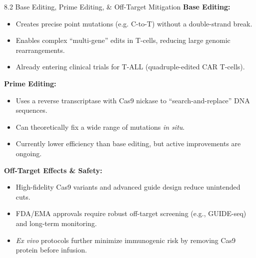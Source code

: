 \documentclass[10pt]{beamer}
\begin{document}
\begin{frame}{8.2 Base Editing, Prime Editing, \& Off-Target Mitigation}
  \textbf{Base Editing:}
  \begin{itemize}
    \item Creates precise point mutations (e.g. C-to-T) without a double-strand break.
    \item Enables complex “multi-gene” edits in T-cells, reducing large genomic rearrangements.
    \item Already entering clinical trials for T-ALL (quadruple-edited CAR T-cells).
  \end{itemize}

  \vspace{0.3em}
  \textbf{Prime Editing:}
  \begin{itemize}
    \item Uses a reverse transcriptase with Cas9 nickase to “search-and-replace” DNA sequences.
    \item Can theoretically fix a wide range of mutations \textit{in situ}.
    \item Currently lower efficiency than base editing, but active improvements are ongoing.
  \end{itemize}

  \vspace{0.3em}
  \textbf{Off-Target Effects \& Safety:}
  \begin{itemize}
    \item High-fidelity Cas9 variants and advanced guide design reduce unintended cuts.
    \item FDA/EMA approvals require robust off-target screening (e.g., GUIDE-seq) and long-term monitoring.
    \item \textit{Ex vivo} protocols further minimize immunogenic risk by removing Cas9 protein before infusion.
  \end{itemize}
\end{frame}
\end{document}
